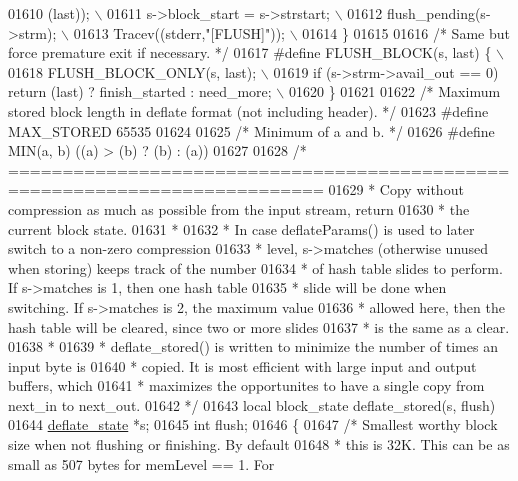 \begin{DoxyCode}
{{{{{01610 \textcolor{preprocessor}{                (last)); \(\backslash\)}
01611 \textcolor{preprocessor}{   s->block\_start = s->strstart; \(\backslash\)}
01612 \textcolor{preprocessor}{   flush\_pending(s->strm); \(\backslash\)}
01613 \textcolor{preprocessor}{   Tracev((stderr,"[FLUSH]")); \(\backslash\)}
01614 \textcolor{preprocessor}{\}}
01615 
01616 \textcolor{comment}{/* Same but force premature exit if necessary. */}
01617 \textcolor{preprocessor}{#define FLUSH\_BLOCK(s, last) \{ \(\backslash\)}
01618 \textcolor{preprocessor}{   FLUSH\_BLOCK\_ONLY(s, last); \(\backslash\)}
01619 \textcolor{preprocessor}{   if (s->strm->avail\_out == 0) return (last) ? finish\_started : need\_more; \(\backslash\)}
01620 \textcolor{preprocessor}{\}}
01621 
01622 \textcolor{comment}{/* Maximum stored block length in deflate format (not including header). */}
01623 \textcolor{preprocessor}{#define MAX\_STORED 65535}
01624 
01625 \textcolor{comment}{/* Minimum of a and b. */}
01626 \textcolor{preprocessor}{#define MIN(a, b) ((a) > (b) ? (b) : (a))}
01627 
01628 \textcolor{comment}{/* ===========================================================================}
01629 \textcolor{comment}{ * Copy without compression as much as possible from the input stream, return}
01630 \textcolor{comment}{ * the current block state.}
01631 \textcolor{comment}{ *}
01632 \textcolor{comment}{ * In case deflateParams() is used to later switch to a non-zero compression}
01633 \textcolor{comment}{ * level, s->matches (otherwise unused when storing) keeps track of the number}
01634 \textcolor{comment}{ * of hash table slides to perform. If s->matches is 1, then one hash table}
01635 \textcolor{comment}{ * slide will be done when switching. If s->matches is 2, the maximum value}
01636 \textcolor{comment}{ * allowed here, then the hash table will be cleared, since two or more slides}
01637 \textcolor{comment}{ * is the same as a clear.}
01638 \textcolor{comment}{ *}
01639 \textcolor{comment}{ * deflate\_stored() is written to minimize the number of times an input byte is}
01640 \textcolor{comment}{ * copied. It is most efficient with large input and output buffers, which}
01641 \textcolor{comment}{ * maximizes the opportunites to have a single copy from next\_in to next\_out.}
01642 \textcolor{comment}{ */}
01643 local block\_state deflate\_stored(s, flush)
01644     \hyperlink{structinternal__state}{deflate\_state} *s;
01645     \textcolor{keywordtype}{int} flush;
01646 \{
01647     \textcolor{comment}{/* Smallest worthy block size when not flushing or finishing. By default}
01648 \textcolor{comment}{     * this is 32K. This can be as small as 507 bytes for memLevel == 1. For}
}}}}}
\end{DoxyCode}
